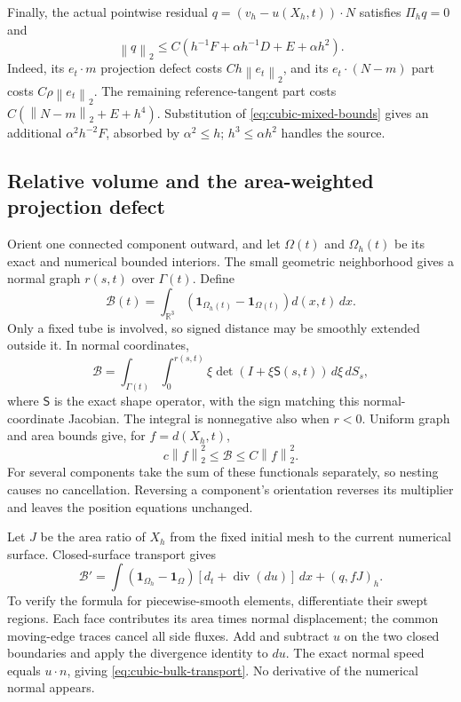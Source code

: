 \documentclass[11pt,a4paper]{article}
\numberwithin{equation}{section}
\theoremstyle{remark}
\newcommand{\R}{\mathbb R}
\newcommand{\norm}[1]{\left\lVert #1\right\rVert}
\begin{document}
Finally, the actual pointwise residual
\(q=(v_h-u(X_h,t))\cdot N\) satisfies \(\Pi_hq=0\) and
\begin{equation}\label{eq:cubic-q}
 \norm q_2\leq C(h^{-1}F+\alpha h^{-1}D+E+\alpha h^2).
\end{equation}
Indeed, its \(e_t\cdot m\) projection defect costs \(Ch\norm{e_t}_2\),
and its \(e_t\cdot(N-m)\) part costs \(C\rho\norm{e_t}_2\).
The remaining reference-tangent part costs
\(C(\norm{N-m}_2+E+h^4)\). Substitution of
\eqref{eq:cubic-mixed-bounds} gives an additional
\(\alpha^2h^{-2}F\), absorbed by \(\alpha^2\leq h\);
\(h^3\leq\alpha h^2\) handles the source.

\subsection{Relative volume and the area-weighted projection defect}

Orient one connected component outward, and let \(\Omega(t)\) and
\(\Omega_h(t)\) be its exact and numerical bounded interiors. The
small geometric neighborhood gives a normal graph \(r(s,t)\) over
\(\Gamma(t)\). Define
\begin{equation}\label{eq:cubic-bulk}
 \mathcal B(t)=\int_{\R^3}
       (\mathbf1_{\Omega_h(t)}-\mathbf1_{\Omega(t)})d(x,t)\,dx .
\end{equation}
Only a fixed tube is involved, so signed distance may be smoothly
extended outside it. In normal coordinates,
\[
 \mathcal B=\int_{\Gamma(t)}\int_0^{r(s,t)}
       \xi\det(I+\xi\mathsf S(s,t))\,d\xi\,dS_s,
\]
where \(\mathsf S\) is the exact shape operator, with the sign matching
this normal-coordinate Jacobian. The integral is nonnegative also
when \(r<0\). Uniform graph and area bounds give, for \(f=d(X_h,t)\),
\begin{equation}\label{eq:cubic-bulk-distance}
              c\norm f_2^2\leq\mathcal B\leq C\norm f_2^2.
\end{equation}
For several components take the sum of these functionals separately,
so nesting causes no cancellation. Reversing a component's orientation
reverses its multiplier and leaves the position equations unchanged.

Let \(J\) be the area ratio of \(X_h\) from the fixed initial mesh to
the current numerical surface. Closed-surface transport gives
\begin{equation}\label{eq:cubic-bulk-transport}
 \mathcal B'=\int(\mathbf1_{\Omega_h}-\mathbf1_\Omega)
             [d_t+\operatorname{div}(du)]\,dx+(q,fJ)_h.
\end{equation}
To verify the formula for piecewise-smooth elements, differentiate
their swept regions. Each face contributes its area times normal
displacement; the common moving-edge traces cancel all side fluxes.
Add and subtract \(u\) on the two closed boundaries and apply the
divergence identity to \(du\). The exact normal speed equals
\(u\cdot n\), giving \eqref{eq:cubic-bulk-transport}. No derivative
of the numerical normal appears.
\end{document}
